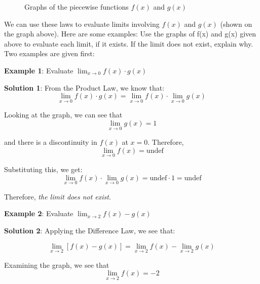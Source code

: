\begin{figure}[htbp]
\centering
{}
\caption{Graphs of the piecewise functions $f(x)$ and $g(x)$}
\end{figure}
We can use these laws to evaluate limits involving $f(x)$ and $g(x)$ (shown on the 
graph above). Here are some examples:
Use the graphs of f(x) and g(x) given above to evaluate each limit, if it exists. 
If the limit does not exist, explain why. Two examples are given first:

\textbf{Example 1}: Evaluate $\lim_{x\to0} f(x) \cdot g(x)$

\textbf{Solution 1}: From the Product Law, we know that:
$$\lim_{x\to0} f(x) \cdot g(x) = \lim_{x\to0}f(x) \cdot \lim_{x\to0} g(x)$$

Looking at the graph, we can see that 
$$\lim_{x\to0}g(x) = 1$$ 

and there is a discontinuity in $f(x)$ at $x=0$. Therefore, 
$$\lim_{x\to0}f(x) = \text{undef}$$

Substituting this, we get: 
$$\lim_{x\to0}f(x) \cdot \lim_{x\to0} g(x) = \text{undef} \cdot 1 = \text{undef}$$

Therefore, \textit{the limit does not exist}. 

\textbf{Example 2}: Evaluate $\lim_{x\to2}f(x) - g(x)$

\textbf{Solution 2}: Applying the Difference Law, we see that:

$$\lim_{x\to2}[f(x) - g(x)] = \lim_{x\to2}f(x) - \lim_{x\to2}g(x)$$

Examining the graph, we see that 
$$\lim_{x\to2}f(x) = -2$$ 

